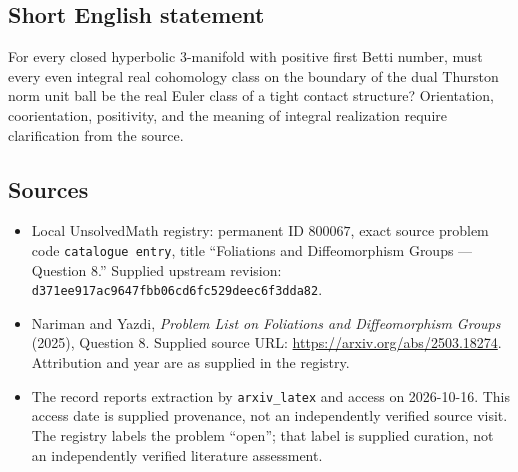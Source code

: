 \documentclass[11pt]{article}
\begin{document}
\subsection{Short English statement}
For every closed hyperbolic \(3\)-manifold with positive first Betti number, must every even integral real cohomology class on the boundary of the dual Thurston norm unit ball be the real Euler class of a tight contact structure? Orientation, coorientation, positivity, and the meaning of integral realization require clarification from the source.
\subsection{Sources}
\begin{itemize}
\item Local UnsolvedMath registry: permanent ID \(800067\), exact source problem code \texttt{catalogue entry}, title ``Foliations and Diffeomorphism Groups --- Question 8.'' Supplied upstream revision: \texttt{d371ee917ac9647fbb06cd6fc529deec6f3dda82}.
\item Nariman and Yazdi, \emph{Problem List on Foliations and Diffeomorphism Groups} (2025), Question 8. Supplied source URL: \url{https://arxiv.org/abs/2503.18274}. Attribution and year are as supplied in the registry.
\item The record reports extraction by \texttt{arxiv\_latex} and access on 2026-10-16. This access date is supplied provenance, not an independently verified source visit. The registry labels the problem ``open''; that label is supplied curation, not an independently verified literature assessment.
\end{itemize}
\end{document}
